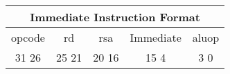 \documentclass[letterpaper, 11pt]{article}
\begin{document}
\begin{center}
		\begin{tabular}{|c|c|c|c|c|}
			\multicolumn{5}{c}{Immediate Instruction Format}\\ \hline
				\hspace{2pt} opcode \hspace{2pt} & \hspace{5pt} rd \hspace{5pt} &  \hspace{4pt} rsa \hspace{4pt} & \hspace{10pt}Immediate  \hspace{10pt} & \hspace{3pt} aluop \hspace{3pt}   \\	\hline
			31 \hfill 26& 25 \hfill 21 &20 \hfill  16& 15  \hfill   4&3 \hfill   0\\ \hline
		
	\end{tabular}
\end{center}
\end{document}
